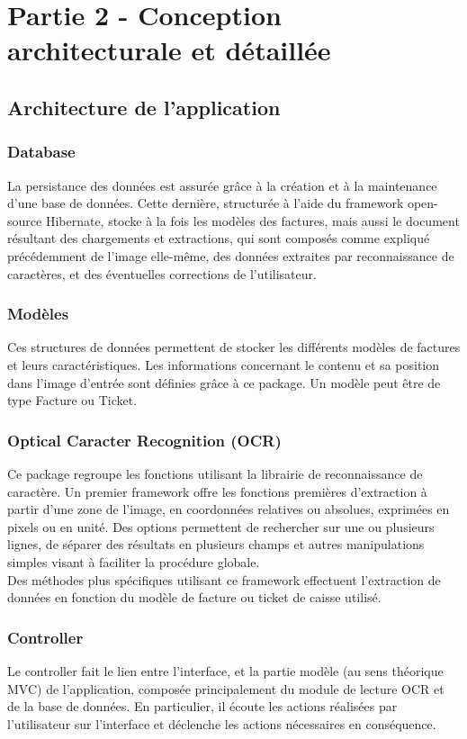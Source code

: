 \chapter{Partie 2 - Conception architecturale et détaillée}

\section{Architecture de l'application}

\subsection{Database}
La persistance des données est assurée grâce à la création et à la maintenance d'une base de données. Cette dernière, structurée à l'aide du framework open-source Hibernate, stocke à la fois les modèles des factures, mais aussi le document résultant des chargements et extractions, qui sont composés comme expliqué précédemment de l'image elle-même, des données extraites par reconnaissance de caractères, et des éventuelles corrections de l'utilisateur.

\subsection{Modèles}
Ces structures de données permettent de stocker les différents modèles de factures et leurs caractéristiques. Les informations concernant le contenu et sa position dans l'image d'entrée sont définies grâce à ce package. Un modèle peut être de type Facture ou Ticket.

\subsection{Optical Caracter Recognition (OCR)}
Ce package regroupe les fonctions utilisant la librairie de reconnaissance de caractère. Un premier framework offre les fonctions premières d'extraction à partir d'une zone de l'image, en coordonnées relatives ou absolues, exprimées en pixels ou en unité. Des options permettent de rechercher sur une ou plusieurs lignes, de séparer des résultats en plusieurs champs et autres manipulations simples visant à faciliter la procédure globale. \\

Des méthodes plus spécifiques utilisant ce framework effectuent l'extraction de données en fonction du modèle de facture ou ticket de caisse utilisé. 

\subsection{Controller}
Le controller fait le lien entre l'interface, et la partie modèle (au sens théorique MVC) de l'application, composée principalement du module de lecture OCR et de la base de données. En particulier, il écoute les actions réalisées par l'utilisateur sur l'interface et déclenche les actions nécessaires en conséquence.

